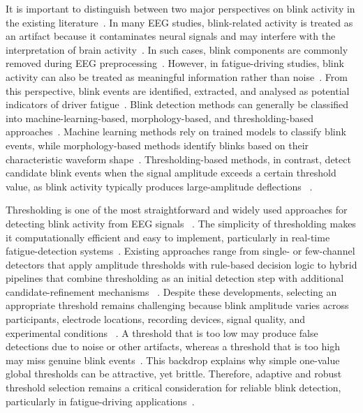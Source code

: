 \documentclass[journal,twoside,web]{ieeecolor}
\begin{document}
%
It is important to distinguish between two major perspectives on blink activity in the existing literature~\citep{croft2000removal,tian2021fatigue}.
In many EEG studies, blink-related activity is treated as an artifact because it contaminates neural signals and may interfere with the interpretation of brain activity~\citep{croft2000removal,akuthota2023artifacts}. In such cases, blink components are commonly removed during EEG preprocessing~\citep{croft2000removal,klein2013reliable}. However, in fatigue-driving studies, blink activity can also be treated as meaningful information rather than noise~\citep{tian2021fatigue,shahbakhti2023fusion}. From this perspective, blink events are identified, extracted, and analysed as potential indicators of driver fatigue~\citep{ko2020eyeblink,shahbakhti2023fusion}. Blink detection methods can generally be classified into machine-learning-based, morphology-based, and thresholding-based approaches~\citep{agarwal2019blink,zhang2023method}. Machine learning methods rely on trained models to classify blink events, while morphology-based methods identify blinks based on their characteristic waveform shape~\citep{rashida2023quantitative,jiang2023eyeblink}. Thresholding-based methods, in contrast, detect
candidate blink events when the signal amplitude exceeds a certain threshold value, as blink activity typically produces large-amplitude deflections ~\citep{chang2016detection,kleifges2017blinker}.

%

%
 
%
%
Thresholding is one of the most straightforward and widely used approaches for detecting blink activity from EEG signals ~\citep{tran2021detection,chang2016detection}.
The simplicity of thresholding makes it computationally efficient and easy to implement, particularly in real-time fatigue-detection systems~\citep{tran2021detection,jefri2022eye}.
Existing approaches range from single- or few-channel detectors that apply amplitude thresholds with rule-based decision logic to hybrid pipelines that combine thresholding as an initial detection step with additional candidate-refinement mechanisms ~\citep{nolan2010faster, chang2016detection,jiang2023eyeblink, ghosh2023automatic,tran2021detection,zhang2023method,wang2022multidimensional,wang2025sliding,kleifges2017blinker,cao2021unsupervised,agarwal2019blink,valderrama2018automatic,guttmann2019new}.
%
Despite these developments, selecting an appropriate threshold remains challenging because blink amplitude varies across participants, electrode locations, recording devices, signal quality, and experimental conditions ~\citep{guttmann2019new,wang2022multidimensional}.
A threshold that is too low may produce false detections due to noise or other artifacts, whereas a threshold that is too high may miss genuine blink events~\citep{tran2021detection,jefri2022eye}.
This backdrop explains why simple one-value global thresholds can be attractive, yet brittle.
Therefore, adaptive and robust threshold selection remains a critical consideration for reliable blink detection, particularly in fatigue-driving applications~\citep{ko2020eyeblink,shahbakhti2023fusion}.
\end{document}
